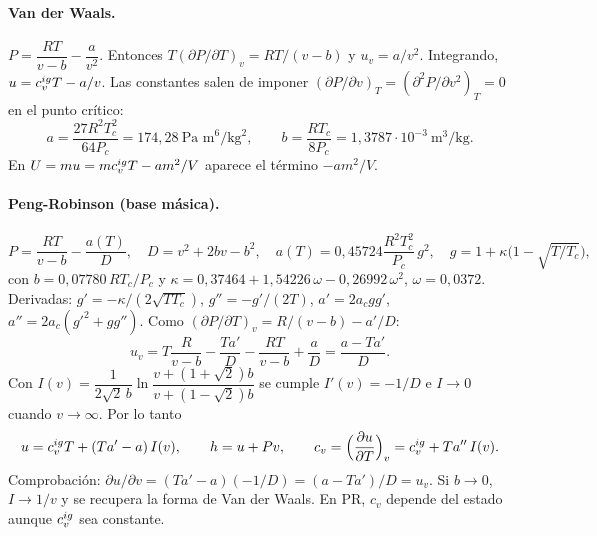 \paragraph{Van der Waals.} $P=\dfrac{RT}{v-b}-\dfrac{a}{v^2}$. Entonces $T(\partial P/\partial T)_v=RT/(v-b)$ y
$u_v=a/v^2$. Integrando, $u=c_v^{ig} T-a/v$. Las constantes salen de imponer
$(\partial P/\partial v)_T=(\partial^2P/\partial v^2)_T=0$ en el punto crítico:
\[
a=\frac{27R^2T_c^2}{64P_c}=174{,}28\ \text{Pa m}^6/\text{kg}^2,\qquad b=\frac{RT_c}{8P_c}=1{,}3787\cdot10^{-3}\ \text{m}^3/\text{kg}.
\]
En $U=mu=mc_v^{ig} T-am^2/V$ aparece el término $-am^2/V$.

\paragraph{Peng-Robinson (base másica).}
\begin{equation}\label{eq:pr}
P=\frac{RT}{v-b}-\frac{a(T)}{D},\quad D=v^2+2bv-b^2,\quad
a(T)=0{,}45724\frac{R^2T_c^2}{P_c}\,g^2,\quad g=1+\kappa\big(1-\sqrt{T/T_c}\big),
\end{equation}
con $b=0{,}07780\,RT_c/P_c$ y $\kappa=0{,}37464+1{,}54226\,\omega-0{,}26992\,\omega^2$, $\omega=0{,}0372$.
Derivadas: $g'=-\kappa/(2\sqrt{TT_c})$, $g''=-g'/(2T)$, $a'=2a_cgg'$, $a''=2a_c(g'^2+gg'')$.
Como $(\partial P/\partial T)_v=R/(v-b)-a'/D$:
\[
u_v=T\frac{R}{v-b}-\frac{Ta'}{D}-\frac{RT}{v-b}+\frac{a}{D}=\frac{a-Ta'}{D}.
\]
Con $I(v)=\dfrac{1}{2\sqrt2\,b}\ln\dfrac{v+(1+\sqrt2)b}{v+(1-\sqrt2)b}$ se cumple $I'(v)=-1/D$ e $I\to0$ cuando $v\to\infty$. Por lo tanto
\begin{equation}\label{eq:upr}
u=c_v^{ig} T+(Ta'-a)\,I(v),\qquad h=u+Pv,\qquad c_v=\Big(\frac{\partial u}{\partial T}\Big)_v=c_v^{ig}+Ta''\,I(v).
\end{equation}
Comprobación: $\partial u/\partial v=(Ta'-a)(-1/D)=(a-Ta')/D=u_v$. Si $b\to0$, $I\to1/v$ y se recupera la forma de Van der Waals.
En PR, $c_v$ depende del estado aunque $c_v^{ig}$ sea constante.

